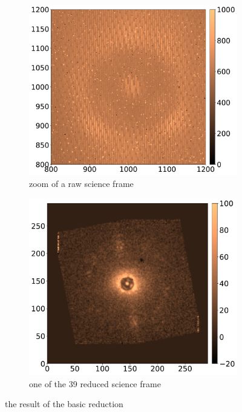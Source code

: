 \documentclass[twoside,single]{lion-msc}
\begin{document}
\begin{figure}[hb]
\centering
\begin{subfigure}{.5\textwidth}
  \centering
  \includegraphics[width=1\linewidth]{rawframe}
  \caption{zoom of a raw science frame}
  \label{fig:rawdata}
\end{subfigure}%
\begin{subfigure}{.5\textwidth}
  \centering
  \includegraphics[width=1\linewidth]{reducedframe}
  \caption{one of the 39 reduced science frame}
\end{subfigure}
\caption{the result of the basic reduction}
\label{fig:reduceddata}
\end{figure}
\end{document}
